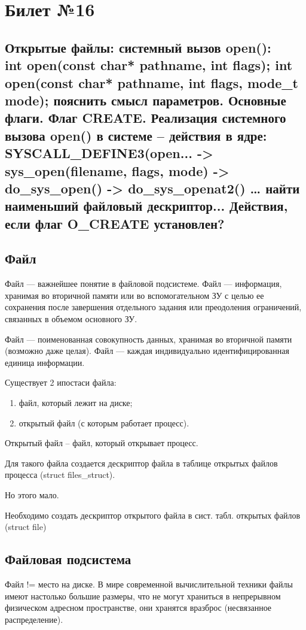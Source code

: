 \chapter{Билет №16}

\section*{Открытые файлы: системный вызов open(): \\ int open(const char* pathname, int flags); int open(const char* pathname, int flags, mode\_t mode); пояснить смысл параметров. Основные флаги. Флаг CREATE. Реализация системного вызова open() в системе – действия в ядре: \\SYSCALL\_DEFINE3(open... -> sys\_open(filename, flags, mode) -> do\_sys\_open() -> do\_sys\_openat2() … найти наименьший файловый дескриптор... Действия, если флаг O\_CREATE установлен?}

\section{Файл}
Файл --- важнейшее понятие в файловой подсистеме. Файл --- информация, хранимая во вторичной памяти или во вспомогательном ЗУ с целью ее сохранения после завершения отдельного задания или преодоления ограничений, связанных в объемом основного ЗУ.

Файл --- поименованная совокупность данных, хранимая во вторичной памяти (возможно даже целая). Файл --- каждая индивидуально идентифицированная единица информации.

Существует 2 ипостаси файла:
\begin{enumerate}
	\item файл, который лежит на диске;
	\item открытый файл (с которым работает процесс).
\end{enumerate}

Открытый файл -- файл, который открывает процесс.

Для такого файла создается дескриптор файла в таблице открытых файлов процесса (struct files\_struct).

Но этого мало.

Необходимо создать дескриптор открытого файла в сист. табл. открытых файлов (struct file)

\section{Файловая подсистема}
Файл != место на диске. В мире современной вычислительной техники файлы имеют настолько большие размеры, что не могут храниться в непрерывном физическом адресном пространстве, они хранятся вразброс (несвязанное распределение).

